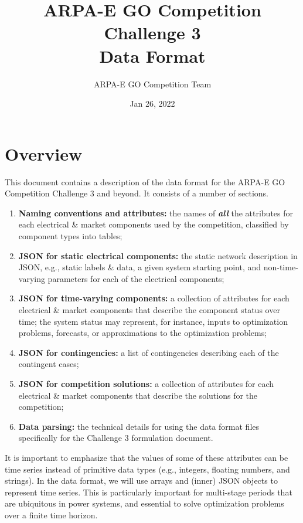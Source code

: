 \documentclass{article}
\title{ARPA-E GO Competition Challenge 3 \\ Data Format}
\author{ARPA-E GO Competition Team}
\date{Jan 26, 2022}
\begin{document}
\maketitle

\section{Overview}

This document contains a description of the data format for the ARPA-E GO Competition Challenge 3 and beyond. It consists of a number of sections.
\begin{enumerate}[I]
    \item {\bf Naming conventions and attributes:} the names of \textit{\textbf{all}} the attributes for each electrical \& market components used by the competition, classified by component types into tables;

    \item {\bf JSON for static electrical components:} the static network description in JSON, e.g., static labels \& data, a given system starting point, and non-time-varying parameters for each of the electrical components;

    \item {\bf JSON for time-varying components:} a collection of attributes for each electrical \& market components that describe the component status over time; the system status may represent, for instance, inputs to optimization problems,  forecasts, or approximations to the optimization problems;
    \item {\bf JSON for contingencies:} a list of contingencies describing each of the contingent cases;
    \item {\bf JSON for competition solutions:} a collection of attributes for each electrical \& market components that describe the solutions for the competition;    
     \item {\bf Data parsing:}
     the technical details for using the data format files specifically for the Challenge 3 formulation document.
\end{enumerate}
It is important to emphasize that the values of some of these attributes can be time series instead of primitive data types (e.g., integers, floating numbers, and strings). 
In the data format, we will use arrays and (inner) JSON objects to represent time series. 
This is particularly important for multi-stage periods that are ubiquitous in power systems, and essential 
to solve optimization problems over a finite time horizon. 
\end{document}
